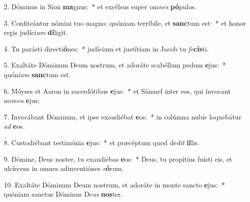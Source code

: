 2. Dóminus in Sion \textbf{ma}gnus:~*  et excélsus super om\textit{nes} \textbf{pó}pulos.\

3. Confiteántur nómini tuo magno: quóniam terríbile, et \textbf{sanc}tum est:~*  et honor regis judíci\textit{um} \textbf{dí}ligit.\

4. Tu parásti directi\textbf{ó}nes:~*  judícium et justítiam in Jacob tu \textit{fe}\textbf{cís}ti.\

5. Exaltáte Dóminum Deum nostrum, et adoráte scabéllum pedum \textbf{e}jus:~*  quóni\textit{am} \textbf{sanc}tum est.\

6. Móyses et Aaron in sacerdótibus \textbf{e}jus:~*  et Sámuel inter eos, qui ínvocant no\textit{men} \textbf{e}jus:\

7. Invocábant Dóminum, et ipse exaudiébat \textbf{e}os:~*  in colúmna nubis loquebátur \textit{ad} \textbf{e}os.\

8. Custodiébant testimónia \textbf{e}jus:~*  et præcéptum quod de\textit{dit} \textbf{il}lis.\

9. Dómine, Deus noster, tu exaudiébas \textbf{e}os:~*  Deus, tu propítius fuísti eis, et ulcíscens in omnes adinventiónes \textit{e}\textbf{ó}rum.\

10. Exaltáte Dóminum Deum nostrum, et adoráte in monte sancto \textbf{e}jus:~*  quóniam sanctus Dóminus De\textit{us} \textbf{nos}ter.\

